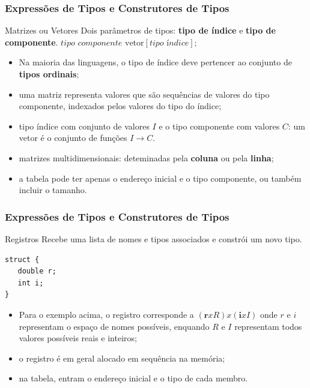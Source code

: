 \documentclass[table]{beamer}
\begin{document}
\begin{frame}[fragile]
   \frametitle{Expressões de Tipos e Construtores de Tipos}
   \begin{block}{Matrizes ou Vetores}
   Dois parâmetros de tipos: \textbf{tipo de índice} e \textbf{tipo de componente}.
   $ \textit{tipo componente } \text{vetor}[\textit{tipo índice}];$
   \begin{itemize}
      \item Na maioria das linguagens, o tipo de índice deve pertencer ao conjunto de \textbf{tipos ordinais};
      \item uma matriz representa valores que são sequências de valores do tipo componente, indexados pelos valores do tipo do índice;
      \item tipo índice com conjunto de valores $I$ e o tipo componente com valores $C$: um vetor é o conjunto de funções $I\to C$.
      \item matrizes multidimensionais: deteminadas pela \textbf{coluna} ou pela \textbf{linha};
      \item a tabela pode ter apenas o endereço inicial e o tipo componente, ou também incluir o tamanho.
   \end{itemize}
   \end{block}
\end{frame}

\begin{frame}[fragile]
   \frametitle{Expressões de Tipos e Construtores de Tipos}
   \begin{block}{Registros}
   Recebe uma lista de nomes e tipos associados e constrói um novo tipo.
   \begin{verbatim}
struct {
   double r;
   int i;
}
   \end{verbatim}
   \begin{itemize}
      \item Para o exemplo acima, o registro corresponde a $(\textbf{r}xR)x(\textbf{i}xI)$ onde $r$ e $i$ representam o espaço de nomes possíveis, enquando $R$ e $I$ representam todos valores possíveis reais e inteiros;
      \item o registro é em geral alocado em sequência na memória;
      \item na tabela, entram o endereço inicial e o tipo de cada membro.
   \end{itemize}
   \end{block}
\end{frame}
\end{document}

